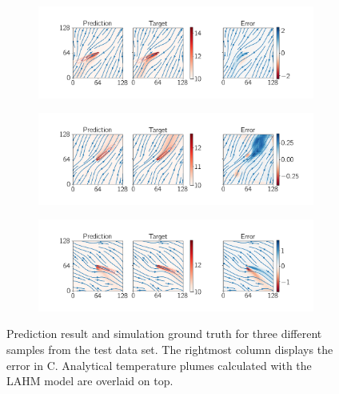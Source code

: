 \documentclass{article} %
\begin{document}
\begin{figure}[!htb]
   \centering
   \begin{subfigure}{0.9\textwidth}
      \includegraphics[width=\textwidth]{img/19_comparison_test.png}
      \vspace{-1cm}
   \end{subfigure}
   \begin{subfigure}{0.9\textwidth}
      \includegraphics[width=\textwidth]{img/32_comparison_test.png}
      \vspace{-1cm}
   \end{subfigure}
   \begin{subfigure}{0.9\textwidth}
      \includegraphics[width=\textwidth]{img/29_comparison_test.png}
      \vspace{-1cm}
   \end{subfigure}
   \caption{Prediction result and simulation ground truth for three different samples from the test data set. The rightmost column displays the error in \degree C. Analytical temperature plumes calculated with the LAHM model are overlaid on top.}
   \label{fig:results}
\end{figure}
\end{document}
